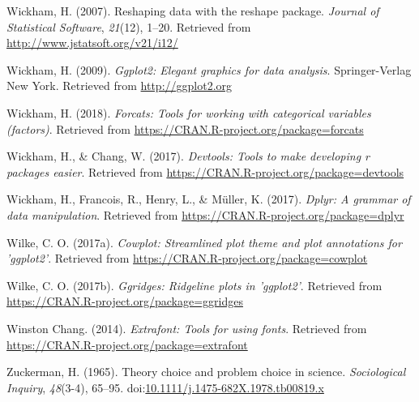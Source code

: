 \documentclass[english,floatsintext,jou]{apa6}
\theoremstyle{definition}
\theoremstyle{definition}
\theoremstyle{definition}
\theoremstyle{remark}
\begin{document}
\hypertarget{ref-R-reshape2}{}
Wickham, H. (2007). Reshaping data with the reshape package.
\emph{Journal of Statistical Software}, \emph{21}(12), 1--20. Retrieved
from \url{http://www.jstatsoft.org/v21/i12/}

\hypertarget{ref-R-ggplot2}{}
Wickham, H. (2009). \emph{Ggplot2: Elegant graphics for data analysis}.
Springer-Verlag New York. Retrieved from \url{http://ggplot2.org}

\hypertarget{ref-R-forcats}{}
Wickham, H. (2018). \emph{Forcats: Tools for working with categorical
variables (factors)}. Retrieved from
\url{https://CRAN.R-project.org/package=forcats}

\hypertarget{ref-R-devtools}{}
Wickham, H., \& Chang, W. (2017). \emph{Devtools: Tools to make
developing r packages easier}. Retrieved from
\url{https://CRAN.R-project.org/package=devtools}

\hypertarget{ref-R-dplyr}{}
Wickham, H., Francois, R., Henry, L., \& Müller, K. (2017). \emph{Dplyr:
A grammar of data manipulation}. Retrieved from
\url{https://CRAN.R-project.org/package=dplyr}

\hypertarget{ref-R-cowplot}{}
Wilke, C. O. (2017a). \emph{Cowplot: Streamlined plot theme and plot
annotations for 'ggplot2'}. Retrieved from
\url{https://CRAN.R-project.org/package=cowplot}

\hypertarget{ref-R-ggridges}{}
Wilke, C. O. (2017b). \emph{Ggridges: Ridgeline plots in 'ggplot2'}.
Retrieved from \url{https://CRAN.R-project.org/package=ggridges}

\hypertarget{ref-R-extrafont}{}
Winston Chang. (2014). \emph{Extrafont: Tools for using fonts}.
Retrieved from \url{https://CRAN.R-project.org/package=extrafont}

\hypertarget{ref-zuckerman}{}
Zuckerman, H. (1965). Theory choice and problem choice in science.
\emph{Sociological Inquiry}, \emph{48}(3-4), 65--95.
doi:\href{https://doi.org/10.1111/j.1475-682X.1978.tb00819.x}{10.1111/j.1475-682X.1978.tb00819.x}

\endgroup





  \clearpage
  
  
  
\end{document}

